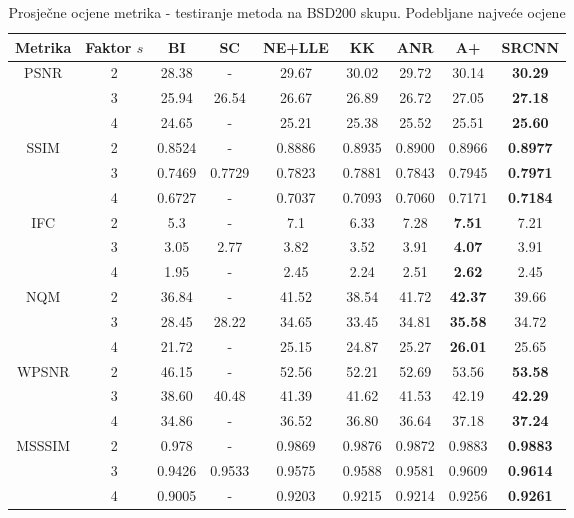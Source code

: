 \documentclass[12pt]{report}
\numberwithin{equation}{section}
\begin{document}
\begin{table}[h!]
\centering
\begin{tabular}{ |c|c|c|c|c|c|c|c|c| } 
\hline
Metrika & Faktor $s$ & BI & SC & NE+LLE & KK & ANR & A+ & SRCNN \\
\hline
\multirow{3}{*}{PSNR}& 2 & 28.38 & - & 29.67 & 30.02 & 29.72 & 30.14 & \textbf{30.29}\\
            & 3 & 25.94 & 26.54 & 26.67 & 26.89 & 26.72 &27.05 & \textbf{27.18} \\
& 4 & 24.65 & - & 25.21 & 25.38 & 25.52 & 25.51 & \textbf{25.60} \\ 
\hline
\multirow{3}{*}{SSIM}& 2 & 0.8524 & - & 0.8886 & 0.8935 & 0.8900 & 0.8966 & \textbf{0.8977}\\
  &           3 & 0.7469 & 0.7729 & 0.7823 & 0.7881 & 0.7843 & 0.7945 & \textbf{0.7971} \\
& 4 & 0.6727 & - & 0.7037 & 0.7093 & 0.7060 & 0.7171 & \textbf{0.7184} \\ 
\hline
\multirow{3}{*}{IFC}& 2 & 5.3 & - & 7.1 & 6.33 & 7.28 & \textbf{7.51} & 7.21\\
  &           3 & 3.05 & 2.77 & 3.82 & 3.52 & 3.91 & \textbf{4.07} & 3.91 \\
& 4 & 1.95 & - & 2.45 & 2.24 & 2.51 & \textbf{2.62} & 2.45 \\ 
\hline
\multirow{3}{*}{NQM}& 2 & 36.84 & - & 41.52 & 38.54 & 41.72 & \textbf{42.37} & 39.66\\
  &           3 & 28.45 & 28.22 & 34.65 & 33.45 & 34.81 & \textbf{35.58} & 34.72 \\
& 4 & 21.72 & - & 25.15 & 24.87 & 25.27 & \textbf{26.01} & 25.65 \\ 
\hline
\multirow{3}{*}{WPSNR}& 2 & 46.15 & - & 52.56 & 52.21 & 52.69 & 53.56 & \textbf{53.58}\\
  &           3 & 38.60 & 40.48 & 41.39 & 41.62 & 41.53 & 42.19 & \textbf{42.29} \\
& 4 & 34.86 & - & 36.52 & 36.80 & 36.64 & 37.18 & \textbf{37.24} \\ 
\hline
\multirow{3}{*}{MSSSIM}& 2 & 0.978 & - & 0.9869 & 0.9876 & 0.9872 & 0.9883 & \textbf{0.9883}\\
  &           3 & 0.9426 & 0.9533 & 0.9575 & 0.9588 & 0.9581 & 0.9609 & \textbf{0.9614} \\
& 4 & 0.9005 & - & 0.9203 & 0.9215 & 0.9214 & 0.9256 & \textbf{0.9261} \\ 
\hline
\end{tabular}
\caption{Prosječne ocjene metrika - testiranje metoda na BSD200 skupu. Podebljane najveće ocjene}
\label{table:3}
\end{table}
\end{document}
